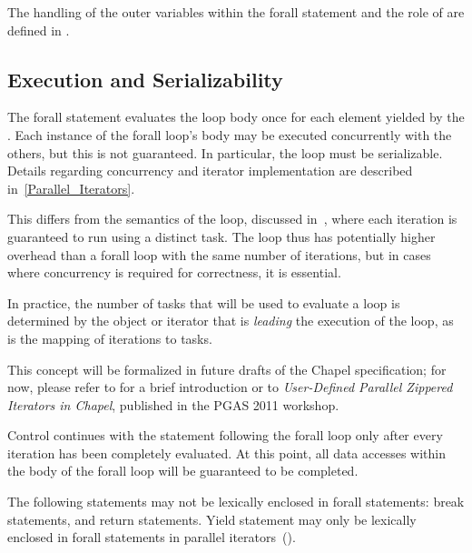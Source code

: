 The handling of the outer variables within the forall statement and
the role of  are defined in .

\subsection{Execution and Serializability}
\label{forall_semantics}

The forall statement evaluates the loop body once for each element
yielded by the .  Each instance of the
forall loop's body may be executed concurrently with the others, but
this is not guaranteed.  In particular, the loop must be serializable.
Details regarding concurrency and iterator implementation are
described in~\ref{Parallel_Iterators}.

This differs from the semantics of the  loop, discussed
in~, where each iteration is guaranteed to run using a
distinct task.  The  loop thus has potentially higher
overhead than a forall loop with the same number of iterations, but in
cases where concurrency is required for correctness, it is essential.

In practice, the number of tasks that will be used to evaluate
a  loop is determined by the object or iterator that
is \emph{leading} the execution of the loop, as is the mapping of
iterations to tasks.

This concept will be formalized in future drafts of the Chapel
specification; for now, please refer
to  for a brief
introduction or to \emph{User-Defined Parallel Zippered Iterators in
Chapel}, published in the PGAS 2011 workshop.

Control continues with the statement following the forall loop only
after every iteration has been completely evaluated.  At this point,
all data accesses within the body of the forall loop will be
guaranteed to be completed.

The following statements may not be lexically enclosed in forall
statements: break statements, and return statements.  Yield statement
may only be lexically enclosed in forall statements in parallel
iterators~().

